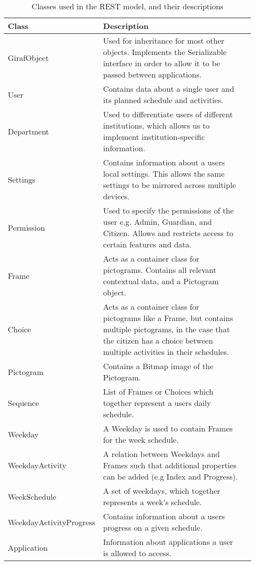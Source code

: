\begin{table}[H] 
\begin{centering}
\begin{tabular}{|l|p{9cm}|l|}
\hline 
Class 					&	Description	\\ \hline
GirafObject				&	Used for inheritance for most other objects. Implements the
Serializable interface in order to allow it to be passed between applications. \\\hline 
User					&	Contains data about a single user and its planned
schedule and activities.\\\hline 
Department  			&	Used to differentiate users of
different institutions, which allows us to implement institution-specific information.\\\hline 
Settings    			&	Contains information about a users local settings. This allows
the same settings to be mirrored across multiple devices. \\\hline 
Permission  			&	Used to specify the permissions of the user e.g. Admin,
Guardian, and Citizen. Allows and restricts access to certain features and data.\\\hline 
Frame              		&   Acts as a container class for pictograms. Contains all
relevant contextual data, and a Pictogram object.\\\hline 
Choice              	&	Acts as a container class for pictograms like a Frame,
but contains multiple pictograms, in the case that the citizen has a choice between
multiple activities in their schedules.\\\hline 
Pictogram              	&	Contains a Bitmap image of the Pictogram. \\\hline
Sequence              	&	List of Frames or Choices which together represent a
users daily schedule. \\\hline 
Weekday              	&	A Weekday is used to contain Frames for the week
schedule.                  \\ \hline 
WeekdayActivity			& A relation between Weekdays and Frames such that additional
properties can be added (e.g Index and Progress).\\\hline 
WeekSchedule         	&	A set of weekdays, which together represents a week's
schedule.\\\hline 
WeekdayActivityProgress & 	Contains information about a users progress on a
given schedule.\\\hline 
Application    			&	Information about applications a user is allowed to access.\\\hline     
\end{tabular}
\caption{Classes used in the REST model, and their descriptions}\label{restModelTableEh}
\end{centering}
\end{table}

